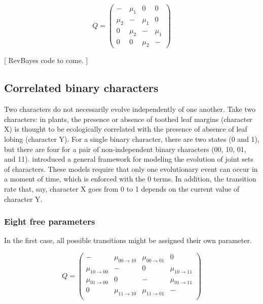 \begin{equation*}
Q = \begin{pmatrix}
- & \mu_1 & 0 & 0 \\
\mu_2 & -   & \mu_1 & 0 \\
0 & \mu_2 & -   & \mu_1 \\
0 & 0 & \mu_2 & - 
\end{pmatrix}
\end{equation*}

[ RevBayes code to come. ]


\subsection{Correlated binary characters}

Two characters do not necessarily evolve independently of one another.
Take two characters: in plants, the presence or absence of toothed leaf margins (character X) is thought to be ecologically correlated with the presence of absence of leaf lobing (character Y).
For a single binary character, there are two states (0 and 1), but there are four for a pair of non-independent binary characters (00, 10, 01, and 11).
\citet{pagel94} introduced a general framework for modeling the evolution of joint sets of characters.
These models require that only one evolutionary event can occur in a moment of time, which is enforced with the 0 terms.
In addition, the transition rate that, say, character X goes from 0 to 1 depends on the current value of character Y.

\subsubsection{Eight free parameters}

In the first case, all possible transitions might be assigned their own parameter.

\begin{equation*}
Q = \begin{pmatrix}
                      - & \mu_{00 \rightarrow 10} & \mu_{00 \rightarrow 01} &                       0 \\
\mu_{10 \rightarrow 00} &                       - &                       0 & \mu_{10 \rightarrow 11} \\
\mu_{01 \rightarrow 00} &                       0 &                       - & \mu_{01 \rightarrow 11} \\
                      0 & \mu_{11 \rightarrow 10} & \mu_{11 \rightarrow 01} &                       - \\
\end{pmatrix}
\end{equation*}

